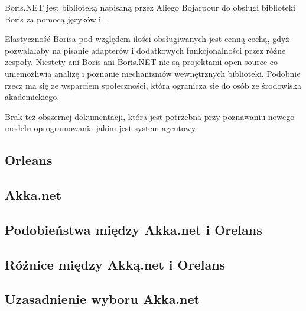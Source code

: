 Boris.NET jest biblioteką napisaną przez Aliego Bojarpour do obsługi biblioteki Boris za pomocą języków \csh i \fsh. 

Elastyczność Borisa pod względem ilości obsługiwanych jest cenną cechą, gdyż pozwalałaby na pisanie adapterów i dodatkowych funkcjonalności przez różne zespoły. 
Niestety ani Boris ani Boris.NET nie są projektami open-source co uniemożliwia analizę i poznanie mechanizmów wewnętrznych biblioteki. Podobnie rzecz ma się ze wsparciem społeczności, która ogranicza sie do osób ze środowiska akademickiego.

Brak też obszernej dokumentacji, która jest potrzebna przy poznawaniu nowego modelu oprogramowania jakim jest system agentowy.

\subsection{Orleans}


\subsection{Akka.net}


\subsection{Podobieństwa między Akka.net i Orelans}


\subsection{Różnice między Akką.net i Orelans}


\subsection{Uzasadnienie wyboru Akka.net}
